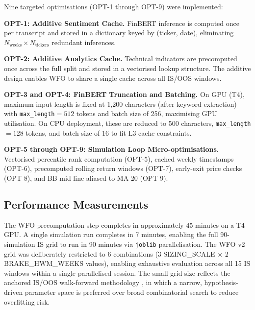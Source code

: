 \documentclass[11pt,twoside,a4paper]{article}
\begin{document}
Nine targeted optimisations (OPT-1 through OPT-9) were implemented:

\textbf{OPT-1: Additive Sentiment Cache.} FinBERT inference is computed once per transcript and stored in a dictionary keyed by (ticker, date), eliminating $N_{\text{weeks}} \times N_{\text{tickers}}$ redundant inferences.

\textbf{OPT-2: Additive Analytics Cache.} Technical indicators are precomputed once across the full split and stored in a vectorised lookup structure. The additive design enables WFO to share a single cache across all IS/OOS windows.

\textbf{OPT-3 and OPT-4: FinBERT Truncation and Batching.} On GPU (T4), maximum input length is fixed at 1,200 characters (after keyword extraction) with \texttt{max\_length}$=512$ tokens and batch size of 256, maximising GPU utilisation. On CPU deployment, these are reduced to 500 characters, \texttt{max\_length}$=128$ tokens, and batch size of 16 to fit L3 cache constraints.

\textbf{OPT-5 through OPT-9: Simulation Loop Micro-optimisations.} Vectorised percentile rank computation (OPT-5), cached weekly timestamps (OPT-6), precomputed rolling return windows (OPT-7), early-exit price checks (OPT-8), and BB mid-line aliased to MA-20 (OPT-9).

\subsection{Performance Measurements}

The WFO precomputation step completes in approximately 45 minutes on a T4 GPU. A single simulation run completes in 7 minutes, enabling the full 90-simulation IS grid to run in 90 minutes via \texttt{joblib} parallelisation. The WFO v2 grid was deliberately restricted to 6 combinations (3 SIZING\_SCALE $\times$ 2 BRAKE\_HWM\_WEEKS values), enabling exhaustive evaluation across all 15 IS windows within a single parallelised session. The small grid size reflects the anchored IS/OOS walk-forward methodology \citep{Pardo2008}, in which a narrow, hypothesis-driven parameter space is preferred over broad combinatorial search to reduce overfitting risk.
\end{document}
